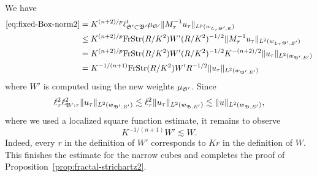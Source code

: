 We have
\begin{align*}
\eqref{eq:fixed-Box-norm2}
&=
K^{(n+2)/p} \ell^{t}_{\mathfrak{S}' \subset \mathfrak{B}'} \mu_{\mathfrak{S}'} \lVert M_{\tau}^{-1} u_{\tau} \rVert_{L^{p}(w_{L_{\tau}\mathfrak{S}',E})}\\
&\leq
K^{(n+2)/p} \mathrm{FrStr}(R/K^{2}) W' (R/K^{2})^{-1/2} \lVert M_{\tau}^{-1} u_{\tau} \rVert_{L^{2}(w_{L_{\tau}\mathfrak{B}',E'})}\\
&=
K^{(n+2)/p} \mathrm{FrStr}(R/K^{2}) W' (R/K^{2})^{-1/2} K^{-(n+2)/2} \lVert u_{\tau} \rVert_{L^{2}(w_{\mathfrak{B}',E'})}\\
&=
K^{-1/(n+1)} \mathrm{FrStr}(R/K^{2}) W' R^{-1/2} \lVert u_{\tau} \rVert_{L^{2}(w_{\mathfrak{B}',E'})}
\end{align*}
where $W'$ is computed using the new weights $\mu_{\mathfrak{S}'}$.
Since
\[
\ell^{2}_{\tau} \ell^{2}_{\mathfrak{B}' : \tau} \lVert u_{\tau}\rVert_{L^{2}(w_{\mathfrak{B}',E'})}
\lesssim
\ell^{2}_{\tau} \lVert u_{\tau}\rVert_{L^{2}(w_{\mathfrak{B},E'})}
\lesssim
\lVert u\rVert_{L^{2}(w_{\mathfrak{B},E'})},
\]
where we used a localized square function estimate, it remains to observe
\begin{equation}
\label{eq:big-const2}
K^{-1/(n+1)} W'
\lesssim
W.
\end{equation}
Indeed, every $r$ in the definition of $W'$ corresponds to $Kr$ in the definition of $W$.
This finishes the estimate for the narrow cubes and completes the proof of Proposition~\ref{prop:fractal-strichartz2}.

